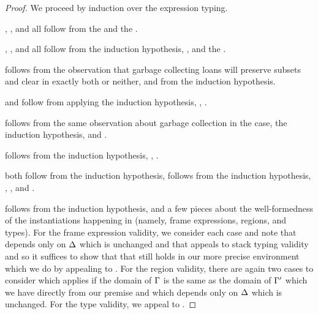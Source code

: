 \begin{proof}
  We proceed by induction over the expression typing.

  , , and  all follow from the
   and the .
  
  , , and  all follow from the
  induction hypothesis, , and the
  .

   follows from the observation that garbage collecting loans will
  preserve subsets and clear in exactly both or neither, and from the induction
  hypothesis.

   and  follow from applying the induction hypothesis,
  ,
  .

   follows from the same observation about garbage collection in
  the  case, the induction hypothesis, and
  .

   follows from the induction hypothesis,
  ,
  .

   both follow from the induction hypothesis, follows from
  the induction hypothesis, ,
  , and
  .

   follows from the induction hypothesis, and a few pieces
  about the well-formedness of the instantiations happening in
   (namely, frame expressions, regions, and types). For
  the frame expression validity, we consider each case and note that
   depends only on $\Delta$ which is unchanged and that
   appeals to stack typing validity and so it suffices to show
  that that still holds in our more precise environment which we do by appealing
  to . For the region validity, there are
  again two cases to consider  which applies if the domain
  of $\Gamma$ is the same as the domain of $\Gamma^\prime$ which we have
  directly from our premise and  which depends only on
  $\Delta$ which is unchanged. For the type validity, we appeal to
  .


\end{proof}
